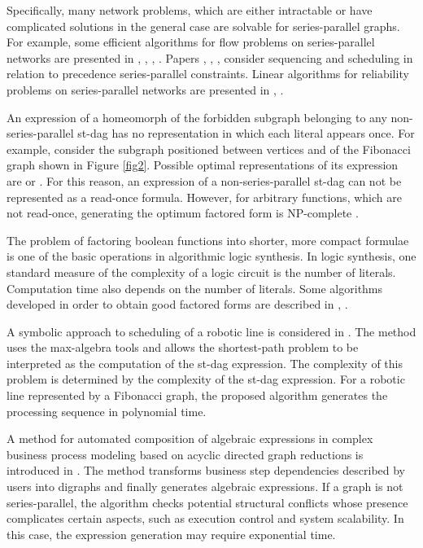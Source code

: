 \documentclass[11pt]{article}\usepackage{amsmath}
\begin{document}
Specifically, many network problems, which are either intractable or have
complicated solutions in the general case are solvable for series-parallel
graphs. For example, some efficient algorithms for flow problems on
series-parallel networks are presented in \cite{BeB}, \cite{BBT}, \cite{JaC},
\cite{Tam}. Papers \cite{AbK}, \cite{FLMB}, \cite{Mon}, \cite{MoS} consider
sequencing and scheduling in relation to precedence series-parallel
constraints. Linear algorithms for reliability problems on series-parallel
networks are presented in \cite{SatW}, \cite{WaC}.

An expression of a homeomorph of the forbidden subgraph belonging to any
non-series-parallel st-dag has no representation in which each literal appears
once. For example, consider the subgraph positioned between vertices  and
 of the Fibonacci graph shown in Figure \ref{fig2}. Possible optimal
representations of its expression are  or . For this
reason, an expression of a non-series-parallel st-dag can not be represented
as a read-once formula. However, for arbitrary functions, which are not
read-once, generating the optimum factored form is NP-complete \cite{Wan}.

The problem of factoring boolean functions into shorter, more compact formulae
is one of the basic operations in algorithmic logic synthesis. In logic
synthesis, one standard measure of the complexity of a logic circuit is the
number of literals. Computation time also depends on the number of literals.
Some algorithms developed in order to obtain good factored forms are described
in \cite{GoM}, \cite{GMR}.

A symbolic approach to scheduling of a robotic line is considered in
\cite{LeK}. The method uses the max-algebra tools and allows the shortest-path
problem to be interpreted as the computation of the st-dag expression. The
complexity of this problem is determined by the complexity of the st-dag
expression. For a robotic line represented by a Fibonacci graph, the proposed
algorithm generates the processing sequence in polynomial time.

A method for automated composition of algebraic expressions in complex
business process modeling based on acyclic directed graph reductions is
introduced in \cite{OFMP}. The method transforms business step dependencies
described by users into digraphs and finally generates algebraic expressions.
If a graph is not series-parallel, the algorithm checks potential structural
conflicts whose presence complicates certain aspects, such as execution
control and system scalability. In this case, the expression generation may
require exponential time.
\end{document}
